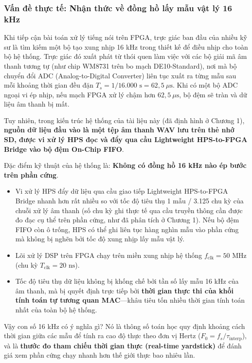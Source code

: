 \subsubsection*{Vấn đề thực tế: Nhận thức về đồng hồ lấy mẫu vật lý 16 kHz}
Khi tiếp cận bài toán xử lý tiếng nói trên FPGA, trực giác ban đầu của nhiều kỹ sư là tìm kiếm một bộ tạo xung nhịp 16 kHz trong thiết kế để điều nhịp cho toàn bộ hệ thống. Trực giác đó xuất phát từ thói quen làm việc với các bộ giải mã âm thanh tương tự (như chip WM8731 trên bo mạch DE10-Standard), nơi mà bộ chuyển đổi ADC (Analog-to-Digital Converter) liên tục xuất ra từng mẫu sau mỗi khoảng thời gian đều đặn $T_s = 1 / 16.000\text{ s} = 62{,}5\ \mu\text{s}$. Khi có một bộ ADC ngoại vi ép nhịp, nếu mạch FPGA xử lý chậm hơn $62{,}5\ \mu\text{s}$, bộ đệm sẽ tràn và dữ liệu âm thanh bị mất.

Tuy nhiên, trong kiến trúc hệ thống của tài liệu này (đã định hình ở Chương 1), \textbf{nguồn dữ liệu đầu vào là một tệp âm thanh WAV lưu trên thẻ nhớ SD, được vi xử lý HPS đọc và đẩy qua cầu Lightweight HPS-to-FPGA Bridge vào bộ đệm On-Chip FIFO}. 

Đặc điểm kỹ thuật của hệ thống là: \textbf{Không có đồng hồ 16 kHz nào ép bước trên phần cứng}.
\begin{itemize}[leftmargin=1.5em, itemsep=2pt]
    \item Vi xử lý HPS đẩy dữ liệu qua cầu giao tiếp Lightweight HPS-to-FPGA Bridge nhanh hơn rất nhiều so với tốc độ tiêu thụ 1 mẫu / 3.125 chu kỳ của chuỗi xử lý âm thanh (số chu kỳ ghi thực tế qua cầu truyền thông cần được đo đạc cụ thể trên phần cứng, như đã phân tích ở Chương 1). Nếu bộ đệm FIFO còn ô trống, HPS có thể ghi liên tục hàng nghìn mẫu vào phần cứng mà không bị nghẽn bởi tốc độ xung nhịp lấy mẫu vật lý.
    \item Lõi xử lý DSP trên FPGA chạy trên miền xung nhịp hệ thống $f_{\text{clk}} = 50\text{ MHz}$ (chu kỳ $T_{\text{clk}} = 20\text{ ns}$).
    \item Tốc độ tiêu thụ dữ liệu không bị khống chế bởi tần số lấy mẫu 16 kHz của âm thanh, mà bị quyết định trực tiếp bởi \textbf{thời gian thực thi của khối tính toán tự tương quan MAC}---khâu tiêu tốn nhiều thời gian tính toán nhất của toàn bộ hệ thống.
\end{itemize}

Vậy con số 16 kHz có ý nghĩa gì? Nó là thông số toán học quy định khoảng cách thời gian giữa các mẫu để tính ra cao độ thực theo đơn vị Hertz ($F_0 = f_s / \tau_{\text{interp}}$), và là \textbf{thước đo tham chiếu thời gian thực (real-time yardstick)} để đánh giá xem phần cứng chạy nhanh hơn thế giới thực bao nhiêu lần.

